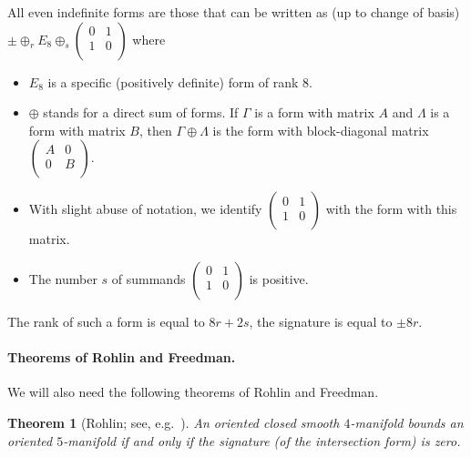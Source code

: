 \documentclass[10pt,a4paper]{article}
\newtheorem{theorem}{Theorem}
\theoremstyle{definition}
\theoremstyle{remark}
\newcommand{\Z}{{\mathbb{Z}}}
\begin{document}
All even indefinite forms are those that can be written as (up to change of basis)
$\pm \oplus_r E_8 \oplus_s \begin{pmatrix} 0 & 1 \\ 1 & 0 \\ \end{pmatrix}$
  where
\begin{itemize}
  \item $E_8$ is a specific (positively definite) form of rank $8$.
   \item $\oplus$ stands for a direct sum of forms. If $\Gamma$ is a form with
     matrix $A$ and $\Lambda$ is a form with matrix $B$, then $\Gamma \oplus
     \Lambda$ is the form with block-diagonal matrix $\begin{pmatrix} A & 0 \\
     0 & B \\ \end{pmatrix}$.
   \item With slight abuse of notation, we identify $\begin{pmatrix} 0 & 1 \\ 1
   & 0 \\ \end{pmatrix}$ with the form with this matrix.
 \item The number $s$ of summands $\begin{pmatrix} 0 & 1 \\ 1
   & 0 \\ \end{pmatrix}$ is positive.
\end{itemize}
The rank of such a form is equal to $8r + 2s$, the signature is equal to $\pm
8r$. 



\paragraph{Theorems of Rohlin and Freedman.}

We will also need the following theorems of Rohlin and Freedman.

\begin{theorem}[Rohlin; see, e.g.~{\cite[Chapter~3]{scorpan05}}]
\label{t:rohlin}
  An oriented closed smooth $4$-manifold bounds an oriented $5$-manifold if and only
  if the signature (of the intersection form) is zero. 
\end{theorem}
\end{document}
